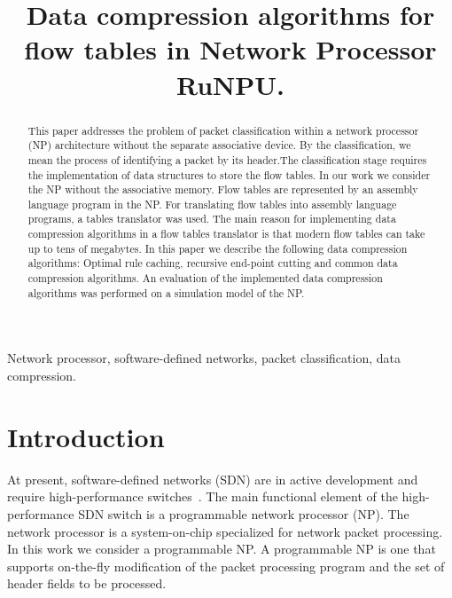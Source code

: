 \documentclass[conference]{IEEEtran}
\begin{document}
\author{
    \and
    }
\title{
    Data compression algorithms for flow tables in Network Processor RuNPU.
}
\maketitle
    \begin{abstract}
        This   paper   addresses   the   problem   of   packet classification  within  a  network  processor  (NP)  
        architecture without the separate associative device. By the classification, we  mean  the  process  of  
        identifying  a  packet  by  its  header.The classification stage requires the implementation of data 
        structures  to  store  the  flow  tables.  In  our  work  we  consider the  NP  without  the  associative  memory.  
        Flow  tables  are represented by an assembly language program in the NP. For translating  flow  tables  into  assembly  
        language  programs,  a tables translator was used. The main reason for implementing data  compression  algorithms  in  a  
        flow  tables  translator  is that  modern  flow  tables  can  take  up  to  tens  of  megabytes. In  this  paper  we  
        describe  the  following  data  compression algorithms: Optimal rule caching, recursive end-point cutting and common data compression algorithms. 
        An evaluation of the implemented data compression algorithms was performed on a simulation model of the NP.
    \end{abstract}
    
    \begin{IEEEkeywords}
        Network processor, software-defined networks, packet classification, data compression.
    \end{IEEEkeywords}

    \section{Introduction}
        At present, software-defined networks (SDN) are in active development and require high-performance switches~\cite{smel2012open}.
        The main functional element of the high-performance SDN switch is a programmable network processor (NP). 
        The network processor is a system-on-chip specialized for network packet processing. 
        In this work we consider a programmable NP. A programmable NP is one that supports on-the-fly modification of the packet 
        processing program and the set of header fields to be processed. 
\end{document}
